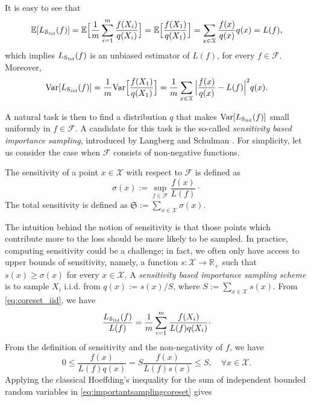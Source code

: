 It is easy to see that 
\[\mathbb E[L_{\mathcal S_{\mathrm{iid}}}(f)] = \mathbb E \Big [ \frac{1}{m} \sum_{i=1}^m \frac{f(X_i)}{q(X_i)}\Big ] = \mathbb E \Big [ \frac{f(X_1)}{q(X_1)} \Big ] = \sum_{x\in \mathcal X} \frac{f(x)}{q(x)}q(x) = L(f),\]
which implies $L_{\mathcal S_{\mathrm{iid}}}(f)$ is an unbiased estimator of $L(f)$, for every $f\in \mathcal F$. Moreover,
\begin{equation} \label{eq:var_iid}
    \mathrm{Var}[L_{\mathcal S_{\mathrm{iid}}}(f)] = \frac{1}{m} \mathrm{Var} \Big [ \frac{f(X_1)}{q(X_1)}\Big ] = \frac{1}{m} \sum_{x\in \mathcal X} \Big | \frac{f(x)}{q(x)} - L(f) \Big |^2 q(x). 
\end{equation}

A natural task is then to find a distribution $q$ that makes $\mathrm{Var}[L_{\mathcal S_{\mathrm{iid}}}(f)]$ small uniformly in $f\in \mathcal F$. A candidate for this task is the so-called \textit{sensitivity based importance sampling}, introduced by Langberg and Schulman \cite{sensitivity}. For simplicity, let us consider the case when $\mathcal F$ consists of non-negative functions.

\begin{definition}
    The sensitivity of a point $x \in \mathcal X$ with respect to $\mathcal F$ is defined as
    \[ \sigma(x) := \sup_{f\in \mathcal F} \frac{f(x)}{L(f)} \cdot\]
    The total sensitivity is defined as $\mathfrak S := \sum_{x\in \mathcal X} \sigma (x)$.
\end{definition}

The intuition behind the notion of sensitivity is that those points which contribute more to the loss should be more likely to be sampled.
In practice, computing sensitivity could be a challenge; in fact, we often only have access to upper bounds of sensitivity, namely, a function $s:\mathcal X \rightarrow \mathbb R_+$ such that $s(x) \ge \sigma(x)$ for every $x\in \mathcal X$. A \emph{sensitivity based importance sampling scheme} is to sample $X_i$ i.i.d. from 
$q(x) := s(x)/S$, where $S:= \sum_{x\in \mathcal X} s(x).$ From \eqref{eq:coreset_iid}, we have
\begin{equation}\label{eq:importantsamplingcoreset}
    \frac{L_{\mathcal{S}_{\mathrm{iid}}}(f)}{L(f)} = \frac{1}{m}\sum_{i=1}^m \frac{f(X_i)}{L(f) q(X_i)}\cdot
\end{equation}
From the definition of sensitivity and the non-negativity of $f$, we have
    \[0 \le \frac{f(x)}{L(f)q(x)} = S\frac{f(x)}{L(f) s(x)} \le S, \quad \forall x\in \mathcal  X.\]
Applying the classical Hoeffding's inequality for the sum of independent bounded random variables in \eqref{eq:importantsamplingcoreset} gives


